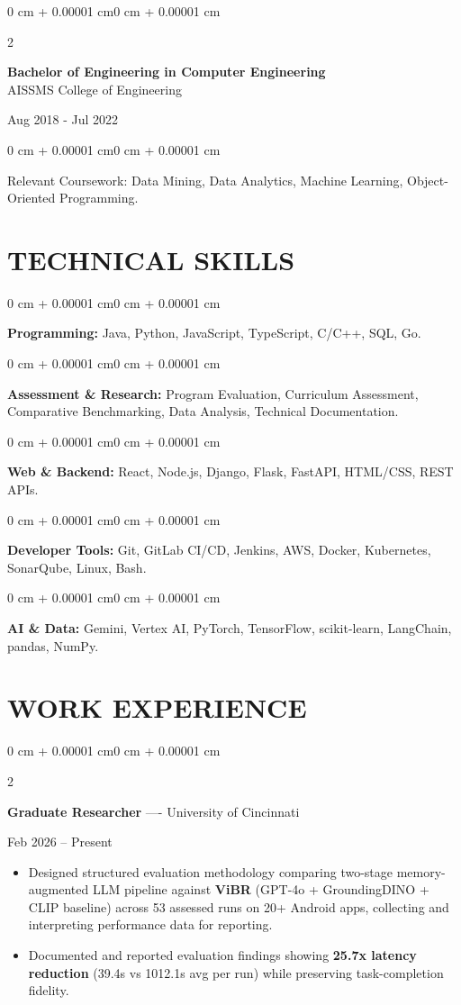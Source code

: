\documentclass[10pt, letterpaper]{article}
\newenvironment{highlights}{
    \begin{itemize}[
        topsep=0.10 cm,
        parsep=0.06 cm,
        partopsep=0pt,
        itemsep=0.06 cm,
        leftmargin=12pt
    ]
}{
    \end{itemize}
}
\newenvironment{onecolentry}{
    \begin{adjustwidth}{0 cm + 0.00001 cm}{0 cm + 0.00001 cm}
}{
    \end{adjustwidth}
}
\newenvironment{twocolentry}[2][]{
    \onecolentry
    \def\secondColumn{#2}
    \setcolumnwidth{\fill, 4.5 cm}
    \begin{paracol}{2}
}{
    \switchcolumn \raggedleft \secondColumn
    \end{paracol}
    \endonecolentry
}
\begin{document}
\begin{twocolentry}{
    Aug 2018 - Jul 2022
}
    \textbf{Bachelor of Engineering in Computer Engineering} \\
    AISSMS College of Engineering
\end{twocolentry}
\begin{onecolentry}
Relevant Coursework: Data Mining, Data Analytics, Machine Learning, Object-Oriented Programming.
\end{onecolentry}
\section{TECHNICAL SKILLS}
\begin{onecolentry}
\textbf{Programming:} Java, Python, JavaScript, TypeScript, C/C++, SQL, Go.
\end{onecolentry}
\vspace{0.06 cm}
\begin{onecolentry}
\textbf{Assessment \& Research:} Program Evaluation, Curriculum Assessment, Comparative Benchmarking, Data Analysis, Technical Documentation.
\end{onecolentry}
\vspace{0.06 cm}
\begin{onecolentry}
\textbf{Web \& Backend:} React, Node.js, Django, Flask, FastAPI, HTML/CSS, REST APIs.
\end{onecolentry}
\vspace{0.06 cm}
\begin{onecolentry}
\textbf{Developer Tools:} Git, GitLab CI/CD, Jenkins, AWS, Docker, Kubernetes, SonarQube, Linux, Bash.
\end{onecolentry}
\vspace{0.06 cm}
\begin{onecolentry}
\textbf{AI \& Data:} Gemini, Vertex AI, PyTorch, TensorFlow, scikit-learn, LangChain, pandas, NumPy.
\end{onecolentry}

\section{WORK EXPERIENCE}
\begin{twocolentry}{Feb 2026 -- Present}
\textbf{Graduate Researcher} ---- University of Cincinnati
\end{twocolentry}
\begin{highlights}
  \item Designed structured evaluation methodology comparing two-stage memory-augmented LLM pipeline against \textbf{ViBR} (GPT-4o + GroundingDINO + CLIP baseline) across 53 assessed runs on 20+ Android apps, collecting and interpreting performance data for reporting.
  \item Documented and reported evaluation findings showing \textbf{25.7x latency reduction} (39.4s vs 1012.1s avg per run) while preserving task-completion fidelity.
\end{highlights}
\end{document}
